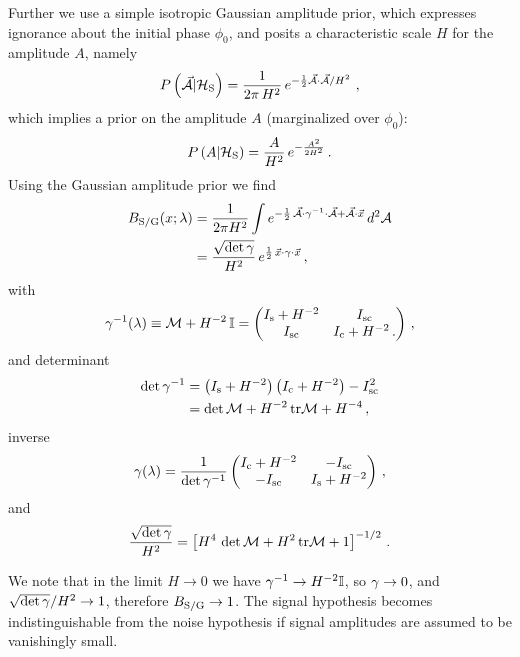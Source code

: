 \documentclass[aps,prd,onecolumn,notitlepage,nofootinbib,superscriptaddress,altaffilletter,floatfix]{revtex4-1}
\begin{document}
Further we use a simple isotropic Gaussian amplitude prior, which expresses ignorance about the initial phase $\phi_0$, and posits a characteristic
scale $H$ for the amplitude $A$, namely
\begin{equation}
  \label{eq:22}
  P\left(\vec{\mathcal{A}}|\mathcal{H}_{\mathrm{S}}\right) = \frac{1}{2\pi\,H^2}\,e^{-\frac{1}{2}{\vec{\mathcal{A}}\cdot\vec{\mathcal{A}}}/H^2}\,\,,
\end{equation}
which implies a prior on the amplitude $A$ (marginalized over $\phi_0$):
\begin{equation}
  \label{eq:28}
  P\left(A|\mathcal{H}_{\mathrm{S}}\right) = \frac{A}{H^2}\,e^{-\frac{A^2}{2H^2}}\,.
\end{equation}
Using the Gaussian amplitude prior we find
\begin{align}
  \label{eq:29}
  B_{\mathrm{S/G}}(x;\lambda) &= \frac{1}{2\pi H^2}\int e^{-\frac{1}{2}\,\vec{\mathcal{A}}\cdot\gamma^{-1}\cdot\vec{\mathcal{A}} + \vec{\mathcal{A}}\cdot\vec{x}}\,d^2\mathcal{A}\\
  &= \frac{\sqrt{\det\gamma}}{H^2}\, e^{\frac{1}{2}\,\vec{x}\cdot\gamma\cdot\vec{x}}\,,
\end{align}
with
\begin{equation}
  \label{eq:25}
  \gamma^{-1}(\lambda) \equiv \mathcal{M} + H^{-2}\,\mathbb{I} =
  \begin{pmatrix}
    I_{\mathrm{s}} + H^{-2} & I_{\mathrm{sc}} \\
    I_{\mathrm{sc}}        & I_{\mathrm{c}} + H^{-2}\,.
  \end{pmatrix}\,,
\end{equation}
and determinant
\begin{align}
  \label{eq:39}
  \det\gamma^{-1} &= \left(I_{\mathrm{s}} + H^{-2}\right)\left(I_{\mathrm{c}}+H^{-2}\right) - I_{\mathrm{sc}}^2\\
  &=\det\mathcal{M} + H^{-2}\,\mathrm{tr}\mathcal{M} + H^{-4}\,,
\end{align}
inverse
\begin{equation}
  \label{eq:41}
  \gamma(\lambda) = \frac{1}{\det\gamma^{-1}}
  \begin{pmatrix}
    I_{\mathrm{c}} + H^{-2} & -I_{\mathrm{sc}} \\
    -I_{\mathrm{sc}}        & I_{\mathrm{s}} + H^{-2}
  \end{pmatrix}\,,
\end{equation}
and
\begin{equation}
  \label{eq:40}
  \frac{\sqrt{\det\gamma}}{H^2} = \left[H^4\,\det\mathcal{M} + H^2\,\mathrm{tr}\mathcal{M} + 1\right]^{-1/2}\,.
\end{equation}

We note that in the limit $H\rightarrow0$ we have $\gamma^{-1}\rightarrow H^{-2}\mathbb{I}$, so $\gamma\rightarrow0$, and
$\sqrt{\det\gamma}/H^2\rightarrow 1$, therefore $B_{\mathrm{S/G}}\rightarrow 1$.
The signal hypothesis becomes indistinguishable from the noise hypothesis if signal amplitudes are assumed to be vanishingly small.
\end{document}

